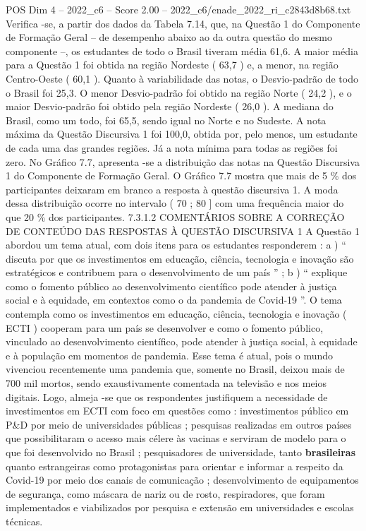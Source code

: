 \begin{textsample}{POS Dim 4 – 2022\_c6 – Score 2.00 – 2022\_c6/enade\_2022\_ri\_c2843d8b68.txt}
Verifica -se, a partir dos dados da Tabela 7.14, que, na Questão 1 do Componente de Formação Geral – de desempenho abaixo ao da outra questão do mesmo componente –, os estudantes de todo o Brasil tiveram média 61,6.
A maior média para a Questão 1 foi obtida na região Nordeste ( 63,7 ) e, a menor, na região Centro-Oeste ( 60,1 ).
Quanto à variabilidade das notas, o Desvio-padrão de todo o Brasil foi 25,3.
O menor Desvio-padrão foi obtido na região Norte ( 24,2 ), e o maior Desvio-padrão foi obtido pela região Nordeste ( 26,0 ).
A mediana do Brasil, como um todo, foi 65,5, sendo igual no Norte e no Sudeste.
A nota máxima da Questão Discursiva 1 foi 100,0, obtida por, pelo menos, um estudante de cada uma das grandes regiões.
Já a nota mínima para todas as regiões foi zero.
No Gráfico 7.7, apresenta -se a distribuição das notas na Questão Discursiva 1 do Componente de Formação Geral.
O Gráfico 7.7 mostra que mais de 5 \% dos participantes deixaram em branco a resposta à questão discursiva 1.
A moda dessa distribuição ocorre no intervalo ( 70 ; 80 ] com uma frequência maior do que 20 \% dos participantes. 7.3.1.2 COMENTÁRIOS SOBRE A CORREÇÃO DE CONTEÚDO DAS RESPOSTAS À QUESTÃO DISCURSIVA 1 A Questão 1 abordou um tema atual, com dois itens para os estudantes responderem : a ) “ discuta por que os investimentos em educação, ciência, tecnologia e inovação são estratégicos e contribuem para o desenvolvimento de um país ” ; b ) “ explique como o fomento público ao desenvolvimento científico pode atender à justiça social e à equidade, em contextos como o da pandemia de Covid-19 ”.
O tema contempla como os investimentos em educação, ciência, tecnologia e inovação ( ECTI ) cooperam para um país se desenvolver e como o fomento público, vinculado ao desenvolvimento científico, pode atender à justiça social, à equidade e à população em momentos de pandemia.
Esse tema é atual, pois o mundo vivenciou recentemente uma pandemia que, somente no Brasil, deixou mais de 700 mil mortos, sendo exaustivamente comentada na televisão e nos meios digitais.
Logo, almeja -se que os respondentes justifiquem a necessidade de investimentos em ECTI com foco em questões como : investimentos público em P\&D por meio de universidades públicas ; pesquisas realizadas em outros países que possibilitaram o acesso mais célere às vacinas e serviram de modelo para o que foi desenvolvido no Brasil ; pesquisadores de universidade, tanto \textbf{brasileiras} quanto estrangeiras como protagonistas para orientar e informar a respeito da Covid-19 por meio dos canais de comunicação ; desenvolvimento de equipamentos de segurança, como máscara de nariz ou de rosto, respiradores, que foram implementados e viabilizados por pesquisa e extensão em universidades e escolas técnicas.

\end{textsample}
